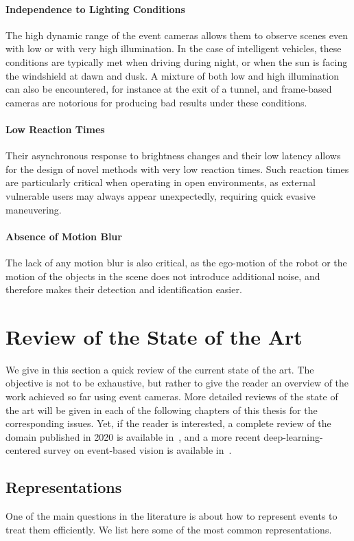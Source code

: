 \paragraph{Independence to Lighting Conditions}
The high dynamic range of the event cameras allows them to observe scenes even with low or with very high illumination. In the case of intelligent vehicles, these conditions are typically met when driving during night, or when the sun is facing the windshield at dawn and dusk. A mixture of both low and high illumination can also be encountered, for instance at the exit of a tunnel, and frame-based cameras are notorious for producing bad results under these conditions.

\paragraph{Low Reaction Times}
Their asynchronous response to brightness changes and their low latency allows for the design of novel methods with very low reaction times. Such reaction times are particularly critical when operating in open environments, as external vulnerable users may always appear unexpectedly, requiring quick evasive maneuvering.

\paragraph{Absence of Motion Blur}
The lack of any motion blur is also critical, as the ego-motion of the robot or the motion of the objects in the scene does not introduce additional noise, and therefore makes their detection and identification easier.

\section{Review of the State of the Art}
We give in this section a quick review of the current state of the art. The objective is not to be exhaustive, but rather to give the reader an overview of the work achieved so far using event cameras. More detailed reviews of the state of the art will be given in each of the following chapters of this thesis for the corresponding issues. Yet, if the reader is interested, a complete review of the domain published in 2020 is available in~\cite{Gallego2020EventbasedVA}, and a more recent deep-learning-centered survey on event-based vision is available in~\cite{Zheng2023DeepLF}.

\subsection{Representations}
One of the main questions in the literature is about how to represent events to treat them efficiently. We list here some of the most common representations.

